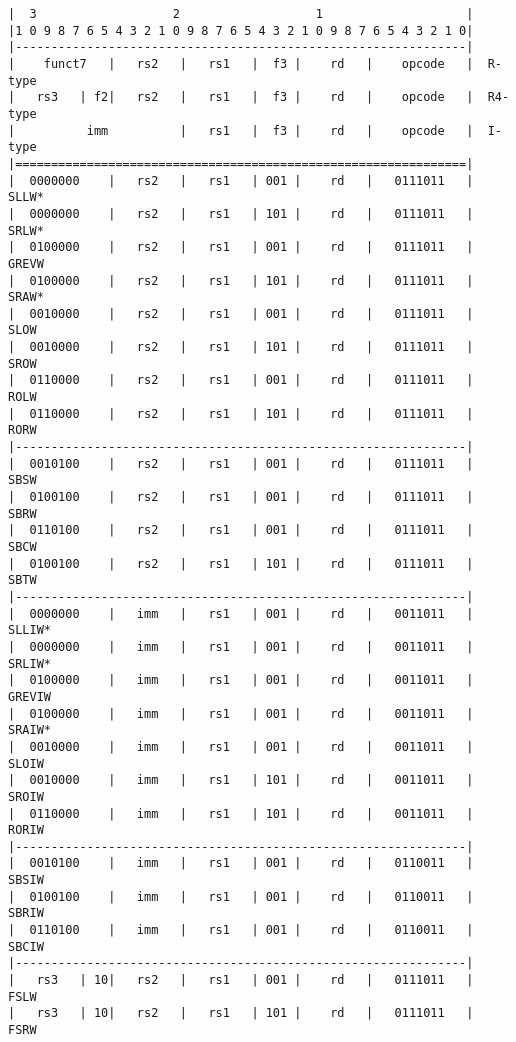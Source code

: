 \begin{minipage}{\linewidth}
\begin{verbatim}
|  3                   2                   1                    |
|1 0 9 8 7 6 5 4 3 2 1 0 9 8 7 6 5 4 3 2 1 0 9 8 7 6 5 4 3 2 1 0|
|---------------------------------------------------------------|
|    funct7   |   rs2   |   rs1   |  f3 |    rd   |    opcode   |  R-type
|   rs3   | f2|   rs2   |   rs1   |  f3 |    rd   |    opcode   |  R4-type
|          imm          |   rs1   |  f3 |    rd   |    opcode   |  I-type
|===============================================================|
|  0000000    |   rs2   |   rs1   | 001 |    rd   |   0111011   |  SLLW*
|  0000000    |   rs2   |   rs1   | 101 |    rd   |   0111011   |  SRLW*
|  0100000    |   rs2   |   rs1   | 001 |    rd   |   0111011   |  GREVW
|  0100000    |   rs2   |   rs1   | 101 |    rd   |   0111011   |  SRAW*
|  0010000    |   rs2   |   rs1   | 001 |    rd   |   0111011   |  SLOW
|  0010000    |   rs2   |   rs1   | 101 |    rd   |   0111011   |  SROW
|  0110000    |   rs2   |   rs1   | 001 |    rd   |   0111011   |  ROLW
|  0110000    |   rs2   |   rs1   | 101 |    rd   |   0111011   |  RORW
|---------------------------------------------------------------|
|  0010100    |   rs2   |   rs1   | 001 |    rd   |   0111011   |  SBSW
|  0100100    |   rs2   |   rs1   | 001 |    rd   |   0111011   |  SBRW
|  0110100    |   rs2   |   rs1   | 001 |    rd   |   0111011   |  SBCW
|  0100100    |   rs2   |   rs1   | 101 |    rd   |   0111011   |  SBTW
|---------------------------------------------------------------|
|  0000000    |   imm   |   rs1   | 001 |    rd   |   0011011   |  SLLIW*
|  0000000    |   imm   |   rs1   | 001 |    rd   |   0011011   |  SRLIW*
|  0100000    |   imm   |   rs1   | 001 |    rd   |   0011011   |  GREVIW
|  0100000    |   imm   |   rs1   | 001 |    rd   |   0011011   |  SRAIW*
|  0010000    |   imm   |   rs1   | 001 |    rd   |   0011011   |  SLOIW
|  0010000    |   imm   |   rs1   | 101 |    rd   |   0011011   |  SROIW
|  0110000    |   imm   |   rs1   | 101 |    rd   |   0011011   |  RORIW
|---------------------------------------------------------------|
|  0010100    |   imm   |   rs1   | 001 |    rd   |   0110011   |  SBSIW
|  0100100    |   imm   |   rs1   | 001 |    rd   |   0110011   |  SBRIW
|  0110100    |   imm   |   rs1   | 001 |    rd   |   0110011   |  SBCIW
|---------------------------------------------------------------|
|   rs3   | 10|   rs2   |   rs1   | 001 |    rd   |   0111011   |  FSLW
|   rs3   | 10|   rs2   |   rs1   | 101 |    rd   |   0111011   |  FSRW

\end{verbatim}
\end{minipage}
